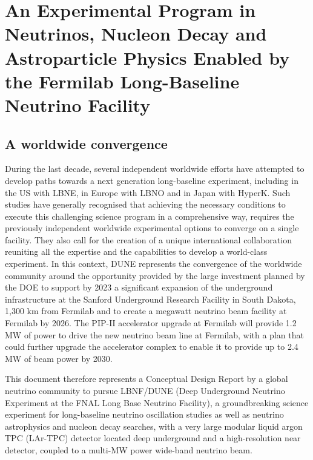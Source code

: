 

\chapter{An Experimental Program in Neutrinos, Nucleon Decay and Astroparticle Physics Enabled by the Fermilab Long-Baseline Neutrino Facility}
\label{ch:project-overview}

%
%

\section{A worldwide convergence}

During the last decade, several independent worldwide efforts have attempted to develop paths towards a next generation long-baseline experiment, including in the US with LBNE, in Europe with LBNO and in Japan with HyperK. Such  studies have generally recognised that achieving the necessary conditions to execute this challenging science program in a comprehensive way, requires the previously independent worldwide experimental options to converge on a single facility. They 
also call for the creation of a unique international collaboration reuniting all the expertise and the capabilities to develop a world-class experiment.
In this context, DUNE represents the convergence of the worldwide community around the opportunity provided by the large investment planned by the DOE to support by 2023 a significant expansion of the underground infrastructure at the Sanford Underground Research Facility in South Dakota, 1,300 km from Fermilab and to create a megawatt neutrino beam facility at Fermilab by 2026.  The PIP-II accelerator upgrade at Fermilab will provide 1.2 MW of power to drive the new neutrino beam line at Fermilab, with a plan that could further upgrade the 
accelerator complex to enable it to provide up to 2.4 MW of beam power by 2030.  

This document therefore represents 
a Conceptual Design Report by a global neutrino community to pursue 
LBNF/DUNE (Deep Underground Neutrino Experiment at the FNAL Long Base Neutrino Facility),
a groundbreaking science experiment for long-baseline neutrino oscillation studies as well as neutrino astrophysics and nucleon decay searches, with a very large modular liquid argon TPC (LAr-TPC) detector located deep underground and a high-resolution near detector, coupled to a  multi-MW power wide-band neutrino beam.

